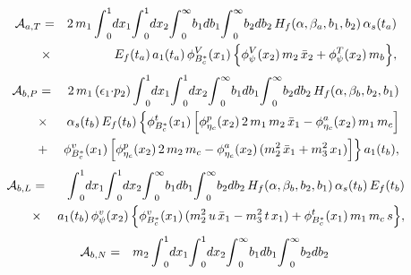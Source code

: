 \documentclass[preprint,superscriptaddress,nofootinbib]{revtex4}
\begin{document}
\begin{appendix}
   \begin{eqnarray}
  {\cal A}_{a,T} &=& 2\,m_{1}\,
  {\int}_{0}^{1}dx_{1}
  {\int}_{0}^{1}dx_{2}
  {\int}_{0}^{\infty}b_{1}db_{1}
  {\int}_{0}^{\infty}b_{2}db_{2}\,
   H_{f}({\alpha},{\beta}_{a},b_{1},b_{2})\,
  {\alpha}_{s}(t_{a})
   \nonumber \\ &{\times}&
  E_{f}(t_{a})\, a_{1}(t_{a})\,
  {\phi}_{B_{c}^{\ast}}^{V}(x_{1})\,
   \Big\{ {\phi}_{\psi}^{V}(x_{2})\, m_{2}\, \bar{x}_{2}
  + {\phi}_{\psi}^{T}(x_{2})\, m_{b} \Big\}
   \label{amp:a-04},
   \end{eqnarray}
   \begin{eqnarray}
  {\cal A}_{b,P} &=&
  2\,m_{1}\,({\epsilon}_{1}{\cdot}p_{2})\,
  {\int}_{0}^{1}dx_{1}
  {\int}_{0}^{1}dx_{2}
  {\int}_{0}^{\infty}b_{1}db_{1}
  {\int}_{0}^{\infty}b_{2}db_{2}\,
  H_{f}({\alpha},{\beta}_{b},b_{2},b_{1})
   \nonumber \\ &{\times}&
 {\alpha}_{s}(t_{b})\, E_{f}(t_{b})\,
  \Big\{ {\phi}_{B_{c}^{\ast}}^{t}(x_{1})\, \Big[
  {\phi}_{{\eta}_{c}}^{p}(x_{2})\, 2\,m_{1}\,m_{2}\,\bar{x}_{1}
 -{\phi}_{{\eta}_{c}}^{a}(x_{2})\,m_{1}\,m_{c} \Big]
   \nonumber \\ &+&
  {\phi}_{B_{c}^{\ast}}^{v}(x_{1})\, \Big[
  {\phi}_{{\eta}_{c}}^{p}(x_{2})\, 2\,m_{2}\,m_{c}
 -{\phi}_{{\eta}_{c}}^{a}(x_{2})\,
  ( m_{2}^{2}\,\bar{x}_{1}+m_{3}^{2}\,x_{1} ) \Big]
   \Big\}\, a_{1}(t_{b})
   \label{amp:b-01},
   \end{eqnarray}
   \begin{eqnarray}
  {\cal A}_{b,L} &=&
  {\int}_{0}^{1}dx_{1}
  {\int}_{0}^{1}dx_{2}
  {\int}_{0}^{\infty}b_{1}db_{1}
  {\int}_{0}^{\infty}b_{2}db_{2}\,
  H_{f}({\alpha},{\beta}_{b},b_{2},b_{1})\,
  {\alpha}_{s}(t_{b})\, E_{f}(t_{b})
   \nonumber \\ &{\times}&
   a_{1}(t_{b})\, {\phi}_{\psi}^{v}(x_{2})\,
   \Big\{ {\phi}_{B_{c}^{\ast}}^{v}(x_{1})\,
  (m_{2}^{2}\,u\,\bar{x}_{1}-m_{3}^{2}\,t\,x_{1})
  + {\phi}_{B_{c}^{\ast}}^{t}(x_{1})\,m_{1}\,m_{c}\,s \Big\}
   \label{amp:b-02},
   \end{eqnarray}
   \begin{eqnarray}
  {\cal A}_{b,N} &=&
  m_{2}\, {\int}_{0}^{1}dx_{1}
  {\int}_{0}^{1}dx_{2}
  {\int}_{0}^{\infty}b_{1}db_{1}
  {\int}_{0}^{\infty}b_{2}db_{2}\,

\end{eqnarray}
\end{appendix}
\end{document}
